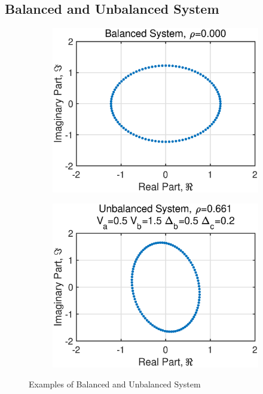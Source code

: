 \subsection{Balanced and Unbalanced System}
\begin{figure}[htb]
    \centering
    \hspace{-0.4cm}
    \begin{subfigure}[b]{0.3\textwidth}
     \centering
     \includegraphics[width=1.2\textwidth]{fig/31/31c1.eps}
    \end{subfigure}
    \hspace{1.4cm}
    \begin{subfigure}[b]{0.3\textwidth}
     \centering
     \includegraphics[width=1.2\textwidth]{fig/31/31c2.eps}
    \end{subfigure}  
    \caption{Examples of Balanced and Unbalanced System}
    \label{fig:3_1_c1}
\end{figure}

